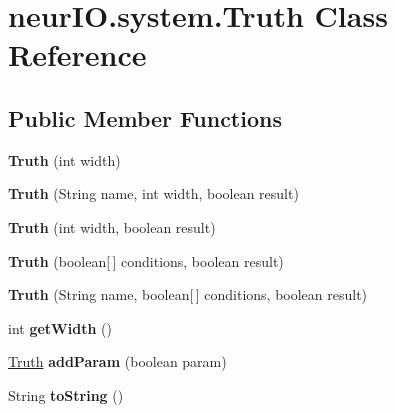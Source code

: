 \hypertarget{classneur_i_o_1_1system_1_1_truth}{}\section{neur\+I\+O.\+system.\+Truth Class Reference}
\label{classneur_i_o_1_1system_1_1_truth}
\subsection*{Public Member Functions}
\begin{DoxyCompactItemize}
\item 
\mbox{\label{classneur_i_o_1_1system_1_1_truth_a097cc75403bc8483160fb5668f0fd039}} 
{\bfseries Truth} (int width)
\item 
\mbox{\label{classneur_i_o_1_1system_1_1_truth_a448eb40dceba7515b95ad0c408ac9dc0}} 
{\bfseries Truth} (String name, int width, boolean result)
\item 
\mbox{\label{classneur_i_o_1_1system_1_1_truth_a8241dbb4e9d35b2d8eb95676752a2b3e}} 
{\bfseries Truth} (int width, boolean result)
\item 
\mbox{\label{classneur_i_o_1_1system_1_1_truth_ab07669c710b191e33cc173e0facb9c5c}} 
{\bfseries Truth} (boolean\mbox{[}$\,$\mbox{]} conditions, boolean result)
\item 
\mbox{\label{classneur_i_o_1_1system_1_1_truth_af87a339fee0afc3c42f31770474d8b41}} 
{\bfseries Truth} (String name, boolean\mbox{[}$\,$\mbox{]} conditions, boolean result)
\item 
\mbox{\label{classneur_i_o_1_1system_1_1_truth_a842f96b6b8887a8c0efaa6d2b9f1a7c4}} 
int {\bfseries get\+Width} ()
\item 
\mbox{\label{classneur_i_o_1_1system_1_1_truth_a7f4d8c214884a035c30e6eb9accb4eb3}} 
\hyperlink{classneur_i_o_1_1system_1_1_truth}{Truth} {\bfseries add\+Param} (boolean param)
\item 
\mbox{\label{classneur_i_o_1_1system_1_1_truth_ac7f532c2a20156db2b85b799730ee959}} 
String {\bfseries to\+String} ()
\end{DoxyCompactItemize}
